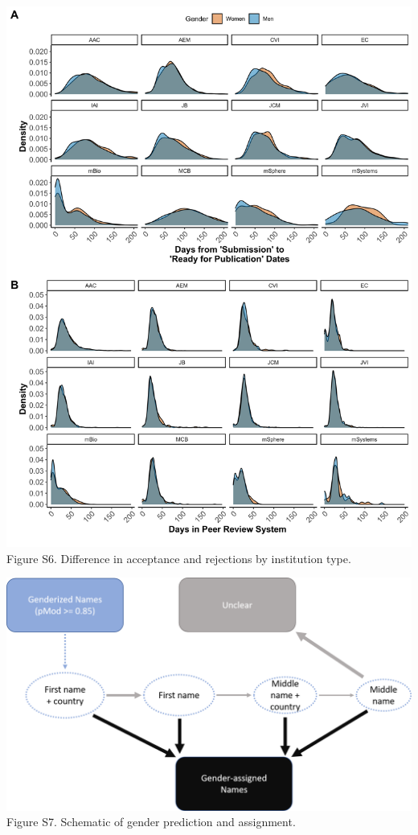 \documentclass[11pt,]{article}
\begin{document}
\includegraphics{Figure_S6.png} Figure S6. Difference in acceptance and
rejections by institution type.

\newpage

\includegraphics{genderize_method.png} Figure S7. Schematic of gender
prediction and assignment.
\end{document}
